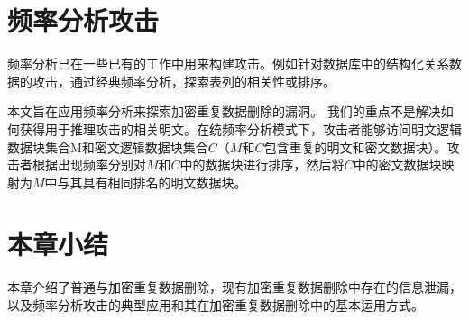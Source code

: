 \section{频率分析攻击}

频率分析已在一些已有的工作中用来构建攻击。例如针对数据库中的结构化关系数据的攻击，通过经典频率分析，探索表列的相关性或排序。

本文旨在应用频率分析来探索加密重复数据删除的漏洞。 我们的重点不是解决如何获得用于推理攻击的相关明文。在统频率分析模式下，攻击者能够访问明文逻辑数据块集合M和密文逻辑数据块集合$C$（$M$和$C$包含重复的明文和密文数据块）。攻击者根据出现频率分别对$M$和$C$中的数据块进行排序，然后将$C$中的密文数据块映射为$M$中与其具有相同排名的明文数据块。

\section{本章小结}

本章介绍了普通与加密重复数据删除，现有加密重复数据删除中存在的信息泄漏，以及频率分析攻击的典型应用和其在加密重复数据删除中的基本运用方式。

